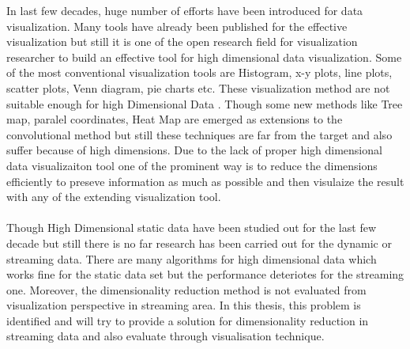 In last few decades, huge number of efforts have been introduced for data visualization. Many tools have already been published for the effective visualization but still it is one of the open research field for visualization researcher to build an effective tool for high dimensional data visualization. Some of the most conventional visualization tools are Histogram, x-y plots, line plots, scatter plots, Venn diagram, pie charts etc. These visualization method are not suitable enough for high Dimensional Data \cite{pf01}. Though some new methods like Tree map, paralel coordinates, Heat Map are emerged as extensions to the convolutional method but still these techniques are far from the target and also suffer because of high dimensions. Due to the lack of proper high dimensional data visualizaiton tool one of the prominent way is to reduce the dimensions efficiently to preseve information as much as possible and then visulaize the result with any of the extending visualization tool.\\\\
Though High Dimensional static data have been studied out for the last few decade but still there is no far research has been carried out for the dynamic or streaming data. There are many algorithms for high dimensional data which works fine for the static data set but the performance deteriotes for the streaming one. Moreover, the dimensionality reduction method is not evaluated from visualization perspective in streaming area. In this thesis, this problem is identified and will try to provide a solution for dimensionality reduction in streaming data and also evaluate through visualisation technique.    


